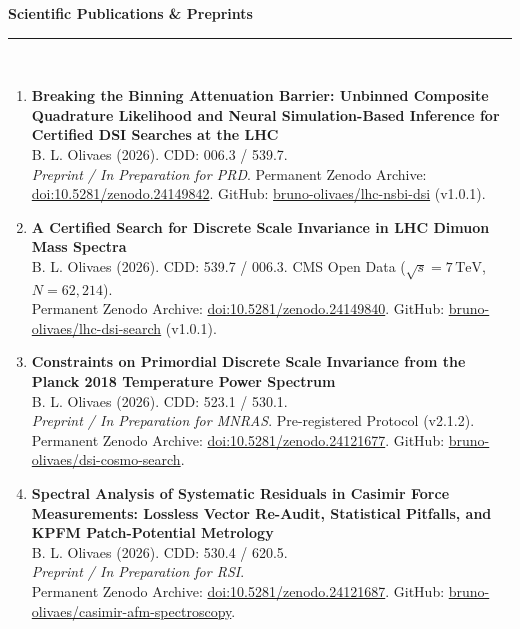 \documentclass[10pt,a4paper]{article}
\begin{document}
\vspace{0.3cm}
\noindent\textbf{\Large Scientific Publications \& Preprints}\\[-0.3cm]
\rule{\textwidth}{0.8pt}\\[0.2cm]
\begin{enumerate}
    \setlength{\itemsep}{3pt}
    \item \textbf{Breaking the Binning Attenuation Barrier: Unbinned Composite Quadrature Likelihood and Neural Simulation-Based Inference for Certified DSI Searches at the LHC}\\
    B. L. Olivaes (2026). CDD: 006.3 / 539.7.\\
    \textit{Preprint / In Preparation for PRD}. Permanent Zenodo Archive: \href{https://doi.org/10.5281/zenodo.24149842}{doi:10.5281/zenodo.24149842}. GitHub: \href{https://github.com/bruno-olivaes/lhc-nsbi-dsi}{bruno-olivaes/lhc-nsbi-dsi} (v1.0.1).
    
    \item \textbf{A Certified Search for Discrete Scale Invariance in LHC Dimuon Mass Spectra}\\
    B. L. Olivaes (2026). CDD: 539.7 / 006.3. CMS Open Data ($\sqrt{s}=7\,\mathrm{TeV}$, $N=62,214$).\\
    Permanent Zenodo Archive: \href{https://doi.org/10.5281/zenodo.24149840}{doi:10.5281/zenodo.24149840}. GitHub: \href{https://github.com/bruno-olivaes/lhc-dsi-search}{bruno-olivaes/lhc-dsi-search} (v1.0.1).

    \item \textbf{Constraints on Primordial Discrete Scale Invariance from the Planck 2018 Temperature Power Spectrum}\\
    B. L. Olivaes (2026). CDD: 523.1 / 530.1.\\
    \textit{Preprint / In Preparation for MNRAS}. Pre-registered Protocol (v2.1.2).\\
    Permanent Zenodo Archive: \href{https://doi.org/10.5281/zenodo.24121677}{doi:10.5281/zenodo.24121677}. GitHub: \href{https://github.com/bruno-olivaes/dsi-cosmo-search}{bruno-olivaes/dsi-cosmo-search}.

    \item \textbf{Spectral Analysis of Systematic Residuals in Casimir Force Measurements: Lossless Vector Re-Audit, Statistical Pitfalls, and KPFM Patch-Potential Metrology}\\
    B. L. Olivaes (2026). CDD: 530.4 / 620.5.\\
    \textit{Preprint / In Preparation for RSI}.\\
    Permanent Zenodo Archive: \href{https://doi.org/10.5281/zenodo.24121687}{doi:10.5281/zenodo.24121687}. GitHub: \href{https://github.com/bruno-olivaes/casimir-afm-spectroscopy}{bruno-olivaes/casimir-afm-spectroscopy}.


\end{enumerate}
\end{document}
